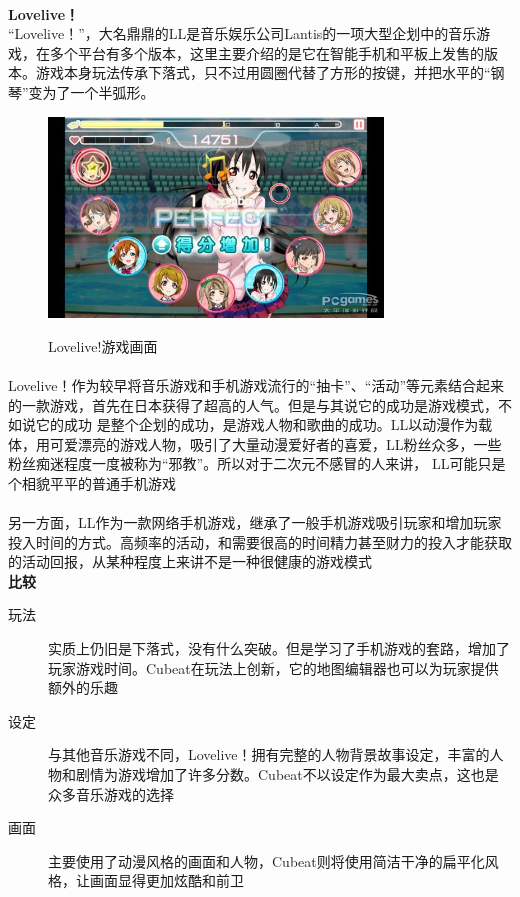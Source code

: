 \documentclass{article} \usepackage{CJK}
\begin{document}
\paragraph{}
\textbf{Lovelive！}\\
“Lovelive！”，大名鼎鼎的LL是音乐娱乐公司Lantis的一项大型企划中的音乐游戏，在多个平台有多个版本，这里主要介绍的是它在智能手机和平板上发售的版本。游戏本身玩法传承下落式，只不过用圆圈代替了方形的按键，并把水平的“钢琴”变为了一个半弧形。
\begin{figure}[H]
  \centering
  \includegraphics[width=24em]{ll.png}\\
  \caption{Lovelive!游戏画面}\label{3-4}
\end{figure}
\paragraph{}
Lovelive！作为较早将音乐游戏和手机游戏流行的“抽卡”、“活动”等元素结合起来的一款游戏，首先在日本获得了超高的人气。但是与其说它的成功是游戏模式，不如说它的成功
是整个企划的成功，是游戏人物和歌曲的成功。LL以动漫作为载体，用可爱漂亮的游戏人物，吸引了大量动漫爱好者的喜爱，LL粉丝众多，一些粉丝痴迷程度一度被称为“邪教”。所以对于二次元不感冒的人来讲，
LL可能只是个相貌平平的普通手机游戏
\paragraph{}
另一方面，LL作为一款网络手机游戏，继承了一般手机游戏吸引玩家和增加玩家投入时间的方式。高频率的活动，和需要很高的时间精力甚至财力的投入才能获取的活动回报，从某种程度上来讲不是一种很健康的游戏模式\\
\textbf{比较}
\begin{description}
  \item[玩法] 实质上仍旧是下落式，没有什么突破。但是学习了手机游戏的套路，增加了玩家游戏时间。Cubeat在玩法上创新，它的地图编辑器也可以为玩家提供额外的乐趣
  \item[设定] 与其他音乐游戏不同，Lovelive！拥有完整的人物背景故事设定，丰富的人物和剧情为游戏增加了许多分数。Cubeat不以设定作为最大卖点，这也是众多音乐游戏的选择
  \item[画面] 主要使用了动漫风格的画面和人物，Cubeat则将使用简洁干净的扁平化风格，让画面显得更加炫酷和前卫
\end{description}
\end{document}
